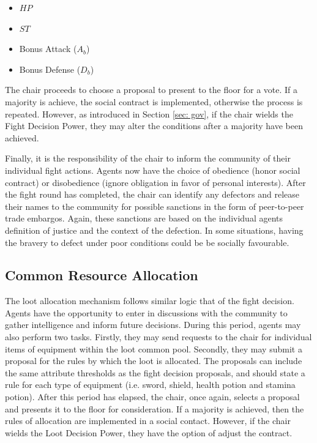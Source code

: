\begin{itemize}
    \item $HP$
    \item $ST$
    \item Bonus Attack ($A_b$)
    \item Bonus Defense ($D_b$)
\end{itemize}

The chair proceeds to choose a proposal to present to the floor for a vote. If a majority is achieve, the social contract is implemented, otherwise the process is repeated. However, as introduced in Section \ref{sec: gov}, if the chair wields the Fight Decision Power, they may alter the conditions after a majority have been achieved. 

Finally, it is the responsibility of the chair to inform the community of their individual fight actions. Agents now have the choice of obedience (honor social contract) or disobedience (ignore obligation in favor of personal interests). After the fight round has completed, the chair can identify any defectors and release their names to the community for possible sanctions in the form of peer-to-peer trade embargos. Again, these sanctions are based on the individual agents definition of justice and the context of the defection. In some situations, having the bravery to defect under poor conditions could be be socially favourable. 

\subsection{Common Resource Allocation}\label{sec: cmr}

% 
The loot allocation mechanism follows similar logic that of the fight decision. Agents have the opportunity to enter in discussions with the community to gather intelligence and inform future decisions. During this period, agents may also perform two tasks. Firstly, they may send requests to the chair for individual items of equipment within the loot common pool. Secondly, they may submit a proposal for the rules by which the loot is allocated. The proposals can include the same attribute thresholds as the fight decision proposals, and should state a rule for each type of equipment (i.e. sword, shield, health potion and stamina potion). After this period has elapsed, the chair, once again, selects a proposal and presents it to the floor for consideration. If a majority is achieved, then the rules of allocation are implemented in a social contact. However, if the chair wields the Loot Decision Power, they have the option of adjust the contract. 

